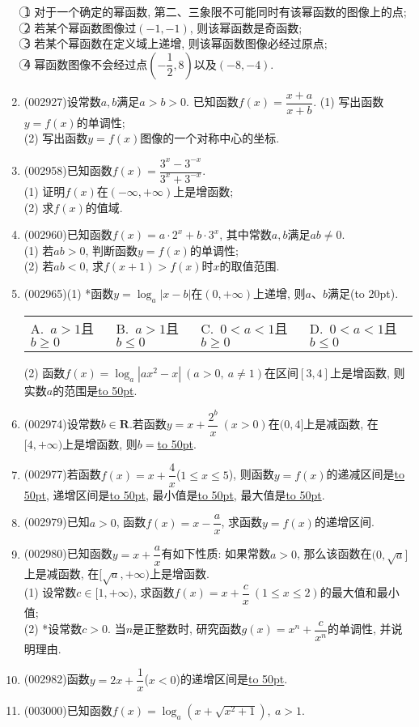 \documentclass[10pt,a4paper]{article}
\newcommand{\blank}[1]{\underline{\hbox to #1pt{}}}
\newcommand{\bracket}[1]{(\hbox to #1pt{})}
\newcommand{\fourch}[4]{\par\begin{tabular}{p{.23\textwidth}p{.23\textwidth}p{.23\textwidth}p{.23\textwidth}}
A.~#1 &B.~#2& C.~#3& D.~#4
\end{tabular}}
\begin{document}
\begin{enumerate}[1.]
\textcircled{1} 对于一个确定的幂函数, 第二、三象限不可能同时有该幂函数的图像上的点;\\
\textcircled{2} 若某个幂函数图像过$(-1,-1)$, 则该幂函数是奇函数;\\
\textcircled{3} 若某个幂函数在定义域上递增, 则该幂函数图像必经过原点;\\
\textcircled{4} 幂函数图像不会经过点$(-\dfrac 12,8)$以及$(-8,-4)$.
\item {\tiny (002927)}设常数$a,b$满足$a>b>0$. 已知函数$f(x)=\dfrac{x+a}{x+b}$.
(1) 写出函数$y=f(x)$的单调性;\\
(2) 写出函数$y=f(x)$图像的一个对称中心的坐标.
\item {\tiny (002958)}已知函数$f(x)=\dfrac{3^x-3^{-x}}{3^x+3^{-x}}$.\\
(1) 证明$f(x)$在$(-\infty,+\infty)$上是增函数;\\
(2) 求$f(x)$的值域.
\item {\tiny (002960)}已知函数$f(x)=a\cdot 2^x+b\cdot 3^x$, 其中常数$a,b$满足$ab\ne 0$.\\
(1) 若$ab>0$, 判断函数$y=f(x)$的单调性;\\
(2) 若$ab<0$, 求$f(x+1)>f(x)$时$x$的取值范围.
\item {\tiny (002965)}(1) *函数$y=\log_a|x-b|$在$(0,+\infty)$上递增, 则$a$、$b$满足\bracket{20}.
\fourch{$a>1$且$b\ge 0$}{$a>1$且$b\le 0$}{$0<a<1$且$b\ge 0$}{$0<a<1$且$b\le 0$}
(2) 函数$f(x)=\log_a|ax^2-x| \ (a>0,\ a\ne 1)$在区间$[3,4]$上是增函数, 则实数$a$的范围是\blank{50}.
\item {\tiny (002974)}设常数$b\in \mathbf{R}$.若函数$y=x+\dfrac{2^b}x \ (x>0)$在$(0,4]$上是减函数, 在$[4,+\infty)$上是增函数, 则$b=$\blank{50}.
\item {\tiny (002977)}若函数$f(x)=x+\dfrac 4x$($1\le x\le 5$), 则函数$y=f(x)$的递减区间是\blank{50}, 递增区间是\blank{50}, 最小值是\blank{50}, 最大值是\blank{50}.
\item {\tiny (002979)}已知$a>0$, 函数$f(x)=x-\dfrac ax$, 求函数$y=f(x)$的递增区间.
\item {\tiny (002980)}已知函数$y=x+\dfrac ax$有如下性质: 如果常数$a>0$, 那么该函数在$(0, \sqrt a]$上是减函数, 在$[\sqrt a, +\infty)$上是增函数.\\
(1) 设常数$c\in [1,+\infty)$, 求函数$f(x)=x+\dfrac cx \ (1\le x\le 2)$的最大值和最小值;\\
(2) *设常数$c>0$. 当$n$是正整数时, 研究函数$g(x)=x^n+\dfrac c{x^n}$的单调性, 并说明理由.
\item {\tiny (002982)}函数$y=2x+\dfrac 1x$($x<0$)的递增区间是\blank{50}.
\item {\tiny (003000)}已知函数$f(x)=\log_a(x+\sqrt{x^2+1}), \ a>1$.\\

\end{enumerate}
\end{document}
